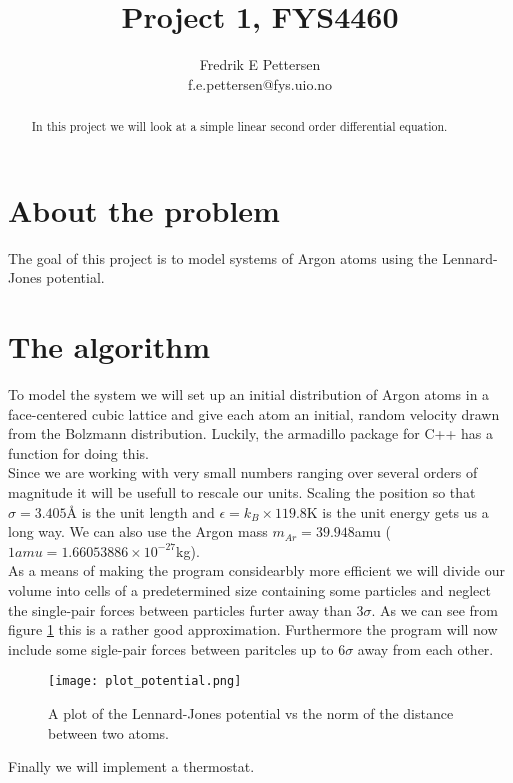 \documentclass[a4paper,english, 10pt, twoside]{article}
\title{Project 1, FYS4460}
\author{Fredrik E Pettersen\\ f.e.pettersen@fys.uio.no}
\begin{document}
\maketitle

\newpage
\begin{abstract}
In this project we will look at a simple linear second order differential equation.
\end{abstract}
\tableofcontents
\newpage


\section{About the problem}
The goal of this project is to model systems of Argon atoms using the Lennard-Jones potential. 

\section{The algorithm}
To model the system we will set up an initial distribution of Argon atoms in a face-centered 
cubic lattice and give each atom an initial, random velocity drawn from the Bolzmann distribution. 
Luckily, the armadillo package for C++ has a function for doing this. \\
Since we are working with very small numbers ranging over several orders of magnitude it will 
be usefull to rescale our units. Scaling the position so that $\sigma = 3.405$Å is the unit 
length and $\epsilon = k_B\times119.8$K is the unit energy gets us a long way. We can also 
use the Argon mass $m_{Ar} = 39.948$amu ($1amu = 1.66053886 \times10^{-27}$kg).\\
As a means of making the program considearbly more efficient we will divide our volume into 
cells of a predetermined size containing some particles and neglect the single-pair 
forces between particles furter away than $3\sigma$. As we can see from figure \ref{potential} 
this is a rather good approximation. Furthermore the program will now include some sigle-pair 
forces between paritcles up to $6\sigma$ away from each other. \\
\begin{figure}[H]
\centering
\texttt{[image: plot\_potential.png]}
\caption{A plot of the Lennard-Jones potential vs the norm of the distance between two atoms.}
\label{potential}
\end{figure}
Finally we will implement a thermostat.
\end{document}
